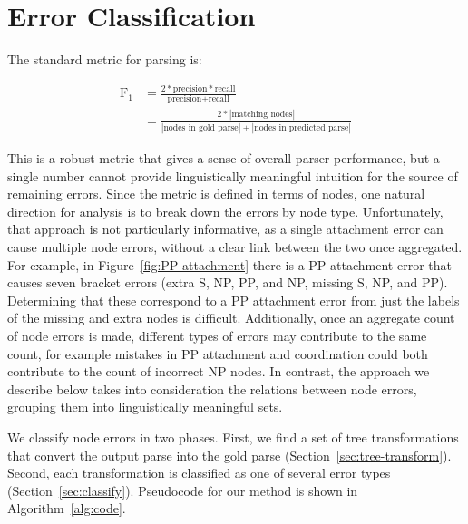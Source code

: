 \section{Error Classification} \label{sec:errors-intro}

The standard metric for parsing is:

\begin{align*}
  \text{F}_1 & = \frac{2 * \text{precision} * \text{recall}}{\text{precision} + \text{recall}} \\
            & = \frac{2 * |\text{matching nodes}|}{|\text{nodes in gold parse}| + |\text{nodes in predicted parse}|}
\end{align*}

This is a robust metric that gives a sense of overall parser performance, but a single number cannot provide linguistically meaningful intuition for the source of remaining errors.
Since the metric is defined in terms of nodes, one natural direction for analysis is to break down the errors by node type.
Unfortunately, that approach is not particularly informative, as a single attachment error can cause multiple node errors, without a clear link between the two once aggregated.
For example, in Figure~\ref{fig:PP-attachment} there is a PP attachment error that causes seven bracket errors (extra S, NP, PP, and NP, missing S, NP, and PP).
Determining that these correspond to a PP attachment error from just the labels of the missing and extra nodes is difficult.
Additionally, once an aggregate count of node errors is made, different types of errors may contribute to the same count, for example mistakes in PP attachment and coordination could both contribute to the count of incorrect NP nodes.
In contrast, the approach we describe below takes into consideration the relations between node errors, grouping them into linguistically meaningful sets.

We classify node errors in two phases.
First, we find a set of tree transformations that convert the output parse into the gold parse (Section~\ref{sec:tree-transform}).
Second, each transformation is classified as one of several error types (Section~\ref{sec:classify}).
Pseudocode for our method is shown in Algorithm~\ref{alg:code}.

